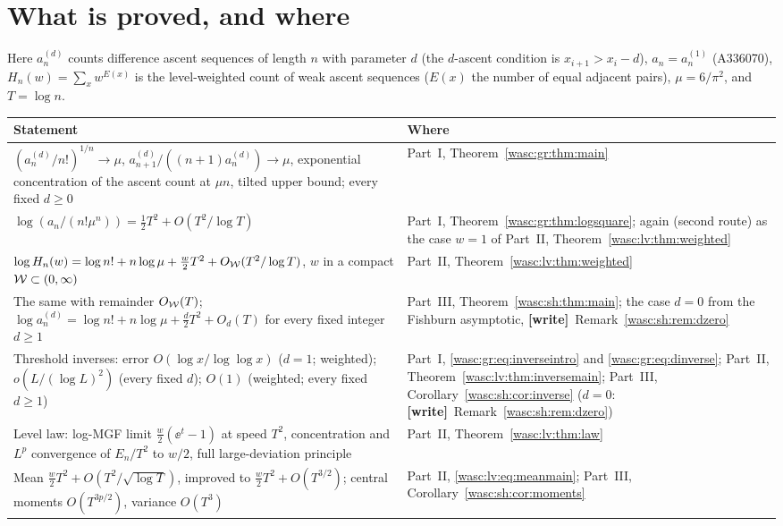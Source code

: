 \documentclass[11pt,a4paper]{article}
\theoremstyle{remark}\newtheorem{remark}[theorem]{Remark}
\numberwithin{equation}{section}
\newcommand{\wtag}{\textup{\textbf{[write]}}}
\begin{document}
\section*{What is proved, and where}\label{wasc:sec:status}
Here $a_n^{(d)}$ counts difference ascent sequences of length $n$ with parameter $d$ (the $d$-ascent condition is $x_{i+1}>x_i-d$), $a_n=a_n^{(1)}$ (A336070), $H_n(w)=\sum_xw^{E(x)}$ is the level-weighted count of weak ascent sequences ($E(x)$ the number of equal adjacent pairs), $\mu=6/\pi^2$, and $T=\log n$.
\begin{center}
\small
\begin{tabular}{@{}>{\raggedright\arraybackslash}p{} >{\raggedright\arraybackslash}p{}@{}}
\toprule
Statement & Where\\
\midrule
$(a^{(d)}_n/n!)^{1/n}\to\mu$, $a^{(d)}_{n+1}/((n+1)a^{(d)}_n)\to\mu$, exponential concentration of the ascent count at $\mu n$, tilted upper bound; every fixed $d\ge0$ & Part~I, Theorem~\ref{wasc:gr:thm:main}\\
$\log(a_n/(n!\mu^n))=\frac12T^2+O(T^2/\log T)$ & Part~I, Theorem~\ref{wasc:gr:thm:logsquare}; again (second route) as the case $w=1$ of Part~II, Theorem~\ref{wasc:lv:thm:weighted}\\
$\log H_n(w)=\log n!+n\log\mu+\frac w2T^2+O_{\mathcal W}(T^2/\log T)$, $w$ in a compact $\mathcal W\subset(0,\infty)$ & Part~II, Theorem~\ref{wasc:lv:thm:weighted}\\
The same with remainder $O_{\mathcal W}(T)$; $\log a^{(d)}_n=\log n!+n\log\mu+\frac d2T^2+O_d(T)$ for every fixed integer $d\ge1$ & Part~III, Theorem~\ref{wasc:sh:thm:main}; the case $d=0$ from the Fishburn asymptotic, \wtag\ Remark~\ref{wasc:sh:rem:dzero}\\
Threshold inverses: error $O(\log x/\log\log x)$ ($d=1$; weighted); $o(L/(\log L)^2)$ (every fixed $d$); $O(1)$ (weighted; every fixed $d\ge1$) & Part~I, \eqref{wasc:gr:eq:inverseintro} and \eqref{wasc:gr:eq:dinverse}; Part~II, Theorem~\ref{wasc:lv:thm:inversemain}; Part~III, Corollary~\ref{wasc:sh:cor:inverse} ($d=0$: \wtag\ Remark~\ref{wasc:sh:rem:dzero})\\
Level law: log-MGF limit $\frac w2(\ee^t-1)$ at speed $T^2$, concentration and $L^p$ convergence of $E_n/T^2$ to $w/2$, full large-deviation principle & Part~II, Theorem~\ref{wasc:lv:thm:law}\\
Mean $\frac w2T^2+O(T^2/\sqrt{\log T})$, improved to $\frac w2T^2+O(T^{3/2})$; central moments $O(T^{3p/2})$, variance $O(T^3)$ & Part~II, \eqref{wasc:lv:eq:meanmain}; Part~III, Corollary~\ref{wasc:sh:cor:moments}\\

\end{tabular}
\end{center}
\end{document}
